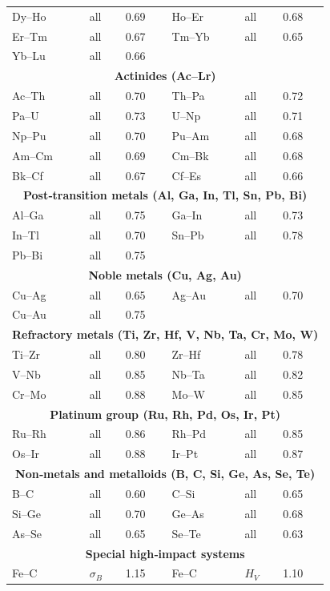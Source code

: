 \documentclass[12pt,a4paper]{article}
\begin{document}
\begin{longtable}{p{1.5cm}p{1.5cm}p{1.2cm}p{1.2cm}p{1.2cm}p{1.2cm}}
		Dy–Ho & all & 0.69 & Ho–Er & all & 0.68 \\
		Er–Tm & all & 0.67 & Tm–Yb & all & 0.65 \\
		Yb–Lu & all & 0.66 & & & \\
		\multicolumn{6}{c}{\textbf{Actinides (Ac–Lr)}} \\
		Ac–Th & all & 0.70 & Th–Pa & all & 0.72 \\
		Pa–U  & all & 0.73 & U–Np & all & 0.71 \\
		Np–Pu & all & 0.70 & Pu–Am & all & 0.68 \\
		Am–Cm & all & 0.69 & Cm–Bk & all & 0.68 \\
		Bk–Cf & all & 0.67 & Cf–Es & all & 0.66 \\
		\multicolumn{6}{c}{\textbf{Post‑transition metals (Al, Ga, In, Tl, Sn, Pb, Bi)}} \\
		Al–Ga & all & 0.75 & Ga–In & all & 0.73 \\
		In–Tl & all & 0.70 & Sn–Pb & all & 0.78 \\
		Pb–Bi & all & 0.75 & & & \\
		\multicolumn{6}{c}{\textbf{Noble metals (Cu, Ag, Au)}} \\
		Cu–Ag & all & 0.65 & Ag–Au & all & 0.70 \\
		Cu–Au & all & 0.75 & & & \\
		\multicolumn{6}{c}{\textbf{Refractory metals (Ti, Zr, Hf, V, Nb, Ta, Cr, Mo, W)}} \\
		Ti–Zr & all & 0.80 & Zr–Hf & all & 0.78 \\
		V–Nb & all & 0.85 & Nb–Ta & all & 0.82 \\
		Cr–Mo & all & 0.88 & Mo–W & all & 0.85 \\
		\multicolumn{6}{c}{\textbf{Platinum group (Ru, Rh, Pd, Os, Ir, Pt)}} \\
		Ru–Rh & all & 0.86 & Rh–Pd & all & 0.85 \\
		Os–Ir & all & 0.88 & Ir–Pt & all & 0.87 \\
		\multicolumn{6}{c}{\textbf{Non‑metals and metalloids (B, C, Si, Ge, As, Se, Te)}} \\
		B–C  & all & 0.60 & C–Si  & all & 0.65 \\
		Si–Ge & all & 0.70 & Ge–As & all & 0.68 \\
		As–Se & all & 0.65 & Se–Te & all & 0.63 \\
		\multicolumn{6}{c}{\textbf{Special high‑impact systems}} \\
		Fe–C  & \(\sigma_B\) & 1.15 & Fe–C  & \(H_V\) & 1.10 \\

\end{longtable}
\end{document}
